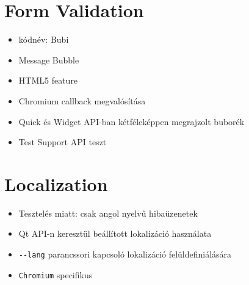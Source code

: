 \documentclass[12pt]{report}
\begin{document}
\section{Form Validation}
\begin{itemize}
    \item kódnév: Bubi
    \item Message Bubble
    \item HTML5 feature
    \item Chromium callback megvalósítása
    \item Quick és Widget API-ban kétféleképpen megrajzolt buborék
    \item Test Support API teszt
\end{itemize}
\pagebreak

\section{Localization}
\begin{itemize}
    \item Tesztelés miatt: csak angol nyelvű hibaüzenetek
    \item Qt API-n keresztül beállított lokalizáció használata
    \item \texttt{-{}-lang} parancssori kapcsoló lokalizáció felüldefiniálására
    \item \texttt{Chromium} specifikus
\end{itemize}
\pagebreak
\end{document}
